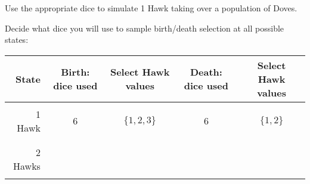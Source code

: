 \documentclass{article}
\begin{document}
Use the appropriate dice to simulate 1 Hawk taking over a population of Doves.

Decide what dice you will use to sample birth/death selection at all possible
states:

\begin{center}
    \begin{tabular}{r|c|c|c|c}
        \toprule
        State & Birth: dice used & Select Hawk values   & Death: dice used &
        Select Hawk values \\
        \midrule
                        &   &                 &   & \\
        1 Hawk          & 6 & \(\{1, 2, 3\}\) & 6 & \(\{1, 2\}\) \\
                        &   &                 &   & \\
        \midrule
                        &   &                 &   & \\
        2 Hawks         &   &                 &   & \\
                        &   &                 &   & \\
        \bottomrule
    \end{tabular}
\end{center}


\subsection*{}
\end{document}
